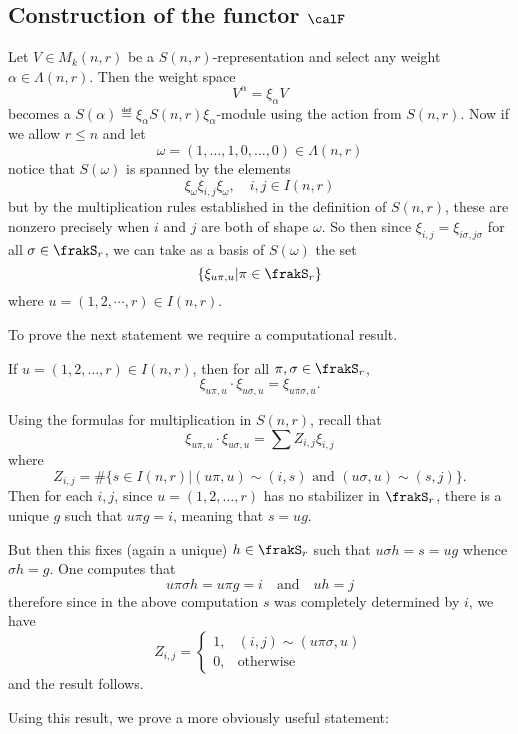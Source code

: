 \documentclass[12pt]{article}
\begin{document}
\subsection{Construction of the functor \texorpdfstring{$\calF$}{F}}

Let $V\in M_k(n,r)$ be a $S(n,r)$-representation and select any weight $\alpha\in\Lambda(n,r)$. Then the weight space 
\[V^\alpha=\xi_\alpha V\]
becomes a $S(\alpha)\eqdef\xi_\alpha S(n,r)\xi_\alpha$-module using the action from $S(n,r)$. Now if we allow $r\le n$ and let
\[\omega=(1,\dots,1,0,\dots,0)\in\Lambda(n,r)\]
notice that $S(\omega)$ is spanned by the elements
\[\xi_\omega\xi_{i,j}\xi_\omega,\quad i,j\in I(n,r)\]
but by the multiplication rules established in the definition of $S(n,r)$, these are nonzero precisely when 
$i$ and $j$ are both of shape $\omega$. So then since $\xi_{i,j}=\xi_{i\sigma,j\sigma}$ for all $\sigma\in\frakS_r$, we can take as
a basis of $S(\omega)$ the set 
\[\{\xi_{u\pi,u}|\pi\in\frakS_r\}\]
where $u=(1,2,\cdots,r)\in I(n,r)$.

To prove the next statement we require a computational result.
\begin{lem}\label{lem:somega-mult}
	If $u=(1,2,\dots,r)\in I(n,r)$, then for all $\pi,\sigma\in\frakS_r$,
	\[\xi_{u\pi,u}\cdot \xi_{u\sigma,u}=\xi_{u\pi\sigma,u}.\]
\end{lem}
\begin{prf}
	Using the formulas for multiplication in $S(n,r)$, recall that 
	\begin{equation}
		\xi_{u\pi,u}\cdot\xi_{u\sigma,u}=\sum Z_{i,j} \xi_{i,j}\label{eq:1}
	\end{equation}
	where 
	\[Z_{i,j}=\#\{s\in I(n,r)|(u\pi,u)\sim(i,s)\text{ and }(u\sigma,u)\sim (s,j)\}.\]
	Then for each $i,j$, since $u=(1,2,\dots,r)$ has no stabilizer in $\frakS_r$, there is a unique 
	$g$ such that $u\pi g=i$, meaning that $s=ug$. 

	But then this fixes (again a unique) $h\in\frakS_r$ such that $u\sigma h=s=u g$ whence $\sigma h= g$. 
	One computes that 
	\[u\pi\sigma h = u\pi g=i\quad\text{and}\quad uh = j\]
	therefore since in the above computation $s$ was completely determined by $i$, we have
	\[Z_{i,j}=\left\{\begin{array}{lr}
		1, &  (i,j)\sim(u\pi\sigma,u)\\
		0, & \text{otherwise}
	\end{array}\right.\]
	and the result follows.
\end{prf}
Using this result, we prove a more obviously useful statement:
\end{document}
